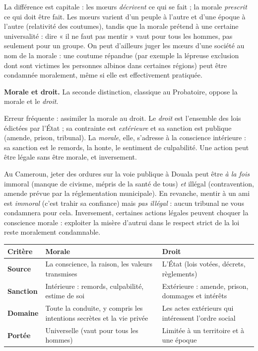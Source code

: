 \documentclass[11pt]{article}
\begin{document}
La différence est capitale : les mœurs \emph{décrivent} ce qui se fait ; la morale \emph{prescrit} ce qui doit être fait. Les mœurs varient d'un peuple à l'autre et d'une époque à l'autre (relativité des coutumes), tandis que la morale prétend à une certaine universalité : dire « il ne faut pas mentir » vaut pour tous les hommes, pas seulement pour un groupe. On peut d'ailleurs juger les mœurs d'une société au nom de la morale : une coutume répandue (par exemple la lépreuse exclusion dont sont victimes les personnes albinos dans certaines régions) peut être condamnée moralement, même si elle est effectivement pratiquée.

\textbf{Morale et droit.} La seconde distinction, classique au Probatoire, oppose la morale et le \emph{droit}.

\begin{attention}
Erreur fréquente : assimiler la morale au droit. Le \emph{droit} est l'ensemble des lois édictées par l'État ; sa contrainte est \emph{extérieure} et sa sanction est publique (amende, prison, tribunal). La \emph{morale}, elle, s'adresse à la conscience intérieure : sa sanction est le remords, la honte, le sentiment de culpabilité. Une action peut être légale sans être morale, et inversement.
\end{attention}

\begin{exemplebox}
Au Cameroun, jeter des ordures sur la voie publique à Douala peut être \emph{à la fois} immoral (manque de civisme, mépris de la santé de tous) \emph{et} illégal (contravention, amende prévue par la réglementation municipale). En revanche, mentir à un ami est \emph{immoral} (c'est trahir sa confiance) mais \emph{pas illégal} : aucun tribunal ne vous condamnera pour cela. Inversement, certaines actions légales peuvent choquer la conscience morale : exploiter la misère d'autrui dans le respect strict de la loi reste moralement condamnable.
\end{exemplebox}

\begin{center}
\begin{tabularx}{\linewidth}{|l|X|X|}\hline
\rowcolor{popblueL} \textbf{Critère} & \textbf{Morale} & \textbf{Droit} \\ \hline
\textbf{Source} & La conscience, la raison, les valeurs transmises & L'État (lois votées, décrets, règlements) \\ \hline
\textbf{Sanction} & Intérieure : remords, culpabilité, estime de soi & Extérieure : amende, prison, dommages et intérêts \\ \hline
\textbf{Domaine} & Toute la conduite, y compris les intentions secrètes et la vie privée & Les actes extérieurs qui intéressent l'ordre social \\ \hline
\textbf{Portée} & Universelle (vaut pour tous les hommes) & Limitée à un territoire et à une époque \\ \hline
\end{tabularx}
\end{center}
\end{document}
